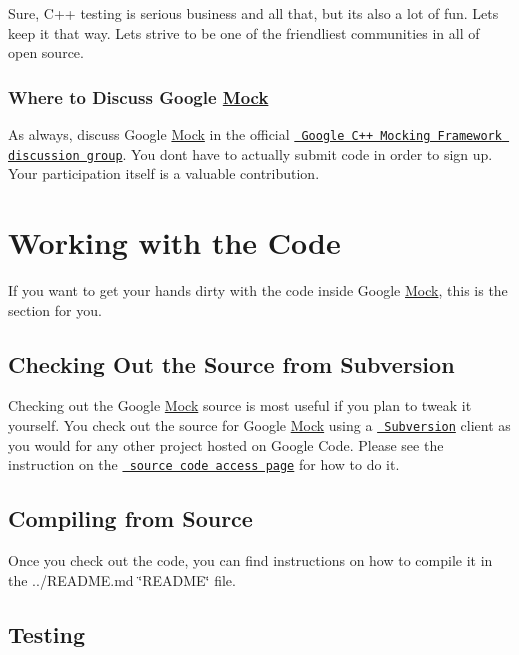 Sure, C++ testing is serious business and all that, but it\textquotesingle{}s also a lot of fun. Let\textquotesingle{}s keep it that way. Let\textquotesingle{}s strive to be one of the friendliest communities in all of open source.

\subsubsection*{Where to Discuss Google \mbox{\hyperlink{class_mock}{Mock}}}

As always, discuss Google \mbox{\hyperlink{class_mock}{Mock}} in the official \href{http://groups.google.com/group/googlemock}\texttt{ Google C++ Mocking Framework discussion group}. You don\textquotesingle{}t have to actually submit code in order to sign up. Your participation itself is a valuable contribution.

\section*{Working with the Code}

If you want to get your hands dirty with the code inside Google \mbox{\hyperlink{class_mock}{Mock}}, this is the section for you.

\subsection*{Checking Out the Source from Subversion}

Checking out the Google \mbox{\hyperlink{class_mock}{Mock}} source is most useful if you plan to tweak it yourself. You check out the source for Google \mbox{\hyperlink{class_mock}{Mock}} using a \href{http://subversion.tigris.org/}\texttt{ Subversion} client as you would for any other project hosted on Google Code. Please see the instruction on the \href{../}\texttt{ source code access page} for how to do it.

\subsection*{Compiling from Source}

Once you check out the code, you can find instructions on how to compile it in the ../\+R\+E\+A\+D\+ME.md \char`\"{}\+R\+E\+A\+D\+M\+E\char`\"{} file.

\subsection*{Testing}

